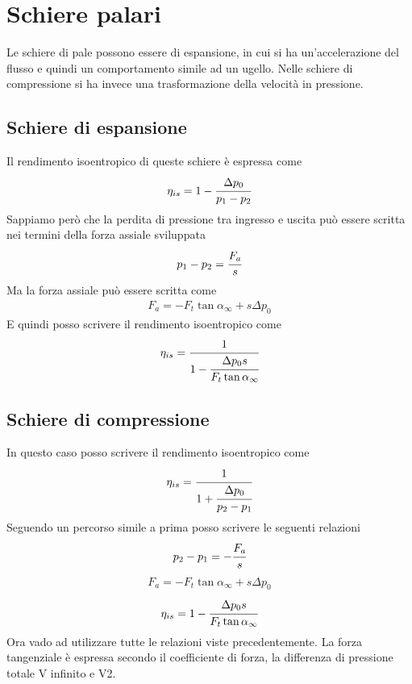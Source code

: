 \section{Schiere palari}
Le schiere di pale possono essere di espansione, in cui si ha un'accelerazione del flusso e quindi un comportamento simile ad un ugello. Nelle schiere di compressione si ha invece una trasformazione della velocità in pressione. 

\subsection{Schiere di espansione}
Il rendimento isoentropico di queste schiere è espressa come 
\begin{equation}
\eta_{is} = 1- \cfrac{\Delta p_0}{p_1 - p_2}
\end{equation}
Sappiamo però che la perdita di pressione tra ingresso e uscita può essere scritta nei termini della forza assiale sviluppata
\begin{equation}
p_1-p_2 = \cfrac{F_a}{s}
\end{equation}
Ma la forza assiale può essere scritta come
\begin{align*}
F_a=  - F_t \tan \alpha_{\infty} + s \Delta p_0
\end{align*}
E quindi posso scrivere il rendimento isoentropico come
\begin{equation}
\eta_{is} = \cfrac{1}{1- \cfrac{\Delta p_0 s}{F_t \tan \alpha_{\infty}}}
\end{equation}
\subsection{Schiere di compressione}
In questo caso posso scrivere il rendimento isoentropico come
\begin{equation}
\eta_{is} = \cfrac{1}{1 + \cfrac{\Delta p_0}{p_2-p_1}}
\end{equation}
Seguendo un percorso simile a prima posso scrivere le seguenti relazioni
\begin{equation}
p_2-p_1 = -\cfrac{F_a}{s}
\end{equation}
\begin{align*}
F_a = -F_t \tan \alpha_{\infty} + s \Delta p_0
\end{align*}
\begin{equation}
\eta_{is} = 1- \cfrac{\Delta p_0 s}{F_t \tan \alpha_{\infty}}
\end{equation}
Ora vado ad utilizzare tutte le relazioni viste precedentemente. 
La forza tangenziale è espressa secondo il coefficiente di forza, la differenza di pressione totale V infinito e V2. 

